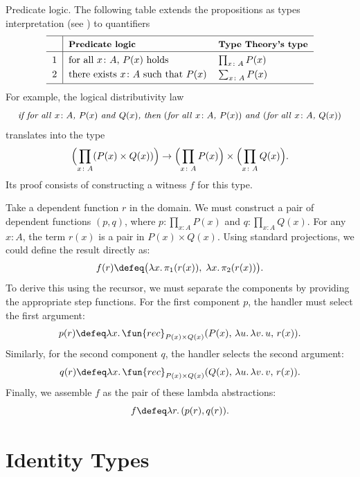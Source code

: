 \begin{lpar}{Predicate logic.}\label{lpar:predicate-logic}
    The following table extends the propositions as types interpretation (see ) to quantifiers
    \[
        \begin{tabular}{l|ll}
            \hline
            &\rule{0mm}{4mm}\textbf{\small Predicate logic}
                &\textbf{\small Type Theory's type}\\[0.3mm]
            \hline
            \rule{0mm}{4mm}1&for all $x\colon A$, $P(x)$ holds
                &$\prod_{x\colon A}P(x)$ \\[1mm]
            2&there exists $x\colon A$ such that $P(x)$
                &$\sum_{x\colon A}P(x)$\\[1mm]
            \hline
        \end{tabular}
    \]
    For example, the logical distributivity law
    \[
        \textit{\small if for all\/ $x\colon A$, $P(x)$ and\/ $Q(x)$,
            then $($for all\/ $x\colon A$, $P(x))$ and\/ $($for all\/ $x\colon A$, $Q(x))$}
    \]
    translates into the type
    \[
        \Bigl(\prod_{x\colon A}(P(x)\times Q(x))\Bigr)
            \to\Bigl(\prod_{x\colon A}P(x)\Bigr)\times\Bigl(\prod_{x\colon A}Q(x)\Bigr).
    \]
    Its proof consists of constructing a witness $f$ for this type.

    Take a dependent function $r$ in the domain. We must construct a pair of dependent functions $(p,q)$, where $p\colon \prod_{x\colon A}P(x)$ and $q\colon \prod_{x\colon A}Q(x)$.
    For any $x\colon A$, the term $r(x)$ is a pair in $P(x)\times Q(x)$. Using standard projections, we could define the result directly as:
    \[
        f(r) \defeq \bigl(\lambda x.\,\pi_1(r(x)),\; \lambda x.\,\pi_2(r(x))\bigr).
    \]
    To derive this using the recursor, we must separate the components by providing the appropriate step functions. For the first component $p$, the handler must select the first argument:
    \[
        p(r)\defeq\lambda x.\,\fun{rec}_{P(x)\times Q(x)}(P(x),\,\lambda u.\,\lambda v.\,u,\,r(x)).
    \]
    Similarly, for the second component $q$, the handler selects the second argument:
    \[
        q(r)\defeq\lambda x.\,\fun{rec}_{P(x)\times Q(x)}(Q(x),\,\lambda u.\,\lambda v.\,v,\,r(x)).
    \]
    Finally, we assemble $f$ as the pair of these lambda abstractions:
    \[
        f\defeq\lambda r.\,(p(r),q(r)).
    \]
\end{lpar}

\section{Identity Types}\label{sec:identity-types}

